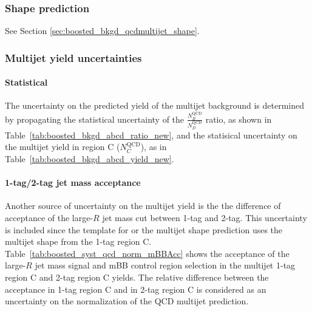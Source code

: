\subsubsection{Shape prediction}
See Section \ref{sec:boosted_bkgd_qcdmultijet_shape}.

\subsubsection{Multijet yield uncertainties}
\label{sec:boosted_bkgd_qcdmultijet_yield_unc}
 
\paragraph{Statistical} 
The uncertainty on the predicted yield of the multijet background is determined by propagating the statistical uncertainty
of the $\frac{N_B^\text{QCD}}{N_D^\text{QCD}}$ ratio, as shown in Table~\ref{tab:boosted_bkgd_abcd_ratio_new}, and the statisical
uncertainty on the multijet yield in region C ($N_C^\text{QCD}$), as in Table~\ref{tab:boosted_bkgd_abcd_yield_new}.
 
\paragraph{1-tag/2-tag jet mass acceptance} 
Another source of uncertainty on the multijet yield is the  
the difference of acceptance of the large-$R$ jet mass cut between 1-tag and 2-tag.
This uncertainty is included since the template for or the multijet shape prediction uses the multijet shape
from the 1-tag region C. Table~\ref{tab:boosted_syst_qcd_norm_mBBAcc} shows the acceptance
of the large-$R$ jet mass signal and mBB control region selection in the multijet 1-tag region C and 2-tag region C yields.
The relative difference between the acceptance in 1-tag region C and in 2-tag region C is considered as an uncertainty on the normalization
of the QCD multijet prediction.
 
